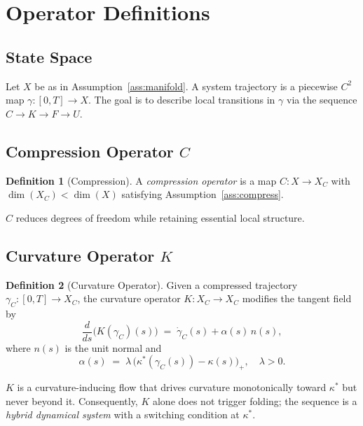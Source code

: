 \documentclass[12pt, oneside]{book}
\theoremstyle{plain}
\theoremstyle{definition}
\newtheorem{definition}{Definition}[section]
\theoremstyle{remark}
\begin{document}
\section{Operator Definitions}\label{sec:operators}

\subsection{State Space}

Let $X$ be as in Assumption~\ref{ass:manifold}. A system trajectory
is a piecewise $C^2$ map $\gamma : [0,T] \to X$. The goal is to
describe local transitions in $\gamma$ via the sequence
$C \to K \to F \to U$.

\subsection{Compression Operator \texorpdfstring{$C$}{C}}

\begin{definition}[Compression]
A \emph{compression operator} is a map $C : X \to X_C$ with
$\dim(X_C) < \dim(X)$ satisfying Assumption~\ref{ass:compress}.
\end{definition}

$C$ reduces degrees of freedom while retaining essential local
structure.

\subsection{Curvature Operator \texorpdfstring{$K$}{K}}

\begin{definition}[Curvature Operator]
Given a compressed trajectory $\gamma_C : [0,T] \to X_C$, the
curvature operator $K : X_C \to X_C$ modifies the tangent field by
\[
\frac{d}{ds}\bigl(K(\gamma_C)(s)\bigr)
\;=\; \dot\gamma_C(s) + \alpha(s)\,n(s),
\]
where $n(s)$ is the unit normal and
\[
\alpha(s) \;=\; \lambda\,\bigl(\kappa^*(\gamma_C(s))
  - \kappa(s)\bigr)_+, \quad \lambda > 0.
\]
\end{definition}

$K$ is a curvature-inducing flow that drives curvature monotonically
toward $\kappa^*$ but never beyond it. Consequently, $K$ alone does
not trigger folding; the sequence is a \emph{hybrid dynamical system}
with a switching condition at $\kappa^*$.
\end{document}
